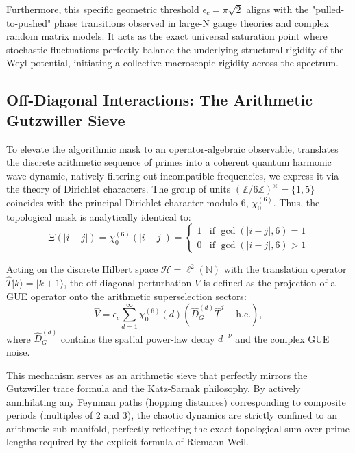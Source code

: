\documentclass[prl,aps,floatfix,superscriptaddress,10pt]{revtex4-2}
\newcommand{\N}{\mathbb{N}}
\newcommand{\Hilb}{\mathcal{H}}
\newcommand{\Zmod}{\mathbb{Z}/6\mathbb{Z}}
\begin{document}
Furthermore, this specific geometric threshold $\epsilon_c = \pi\sqrt{2}$ aligns with the "pulled-to-pushed" phase transitions observed in large-N gauge theories and complex random matrix models\cite{Gross1980, Cunden2018}. It acts as the exact universal saturation point where stochastic fluctuations perfectly balance the underlying structural rigidity of the Weyl potential, initiating a collective macroscopic rigidity across the spectrum.

\subsection{Off-Diagonal Interactions: The Arithmetic Gutzwiller Sieve}

To elevate the algorithmic mask to an operator-algebraic observable, translates the discrete arithmetic sequence of primes into a coherent quantum harmonic wave dynamic, natively filtering out incompatible frequencies, we express it via the theory of Dirichlet characters. The group of units $(\Zmod)^\times = \{1, 5\}$ coincides with the principal Dirichlet character modulo 6, $\chi_0^{(6)}$. Thus, the topological mask is analytically identical to:
\begin{equation}
\Xi(|i-j|) = \chi_0^{(6)}(|i-j|) = \begin{cases} 
1 & \text{if } \gcd(|i-j|, 6) = 1 \\ 
0 & \text{if } \gcd(|i-j|, 6) > 1 
\end{cases}
\end{equation}

Acting on the discrete Hilbert space $\Hilb = \ell^2(\N)$ with the translation operator $\hat{T}|k\rangle = |k+1\rangle$, the off-diagonal perturbation $\hat{V}$ is defined as the projection of a GUE operator onto the arithmetic superselection sectors:
\begin{equation}
\label{eq:interaction}
\hat{V} = \epsilon_c \sum_{d=1}^{\infty} \chi_0^{(6)}(d) \left( \hat{D}_G^{(d)} \hat{T}^d + \text{h.c.} \right),
\end{equation}
where $\hat{D}_G^{(d)}$ contains the spatial power-law decay $d^{-\nu}$ and the complex GUE noise. 

This mechanism serves as an arithmetic sieve that perfectly mirrors the Gutzwiller trace formula and the Katz-Sarnak philosophy. By actively annihilating any Feynman paths (hopping distances) corresponding to composite periods (multiples of 2 and 3), the chaotic dynamics are strictly confined to an arithmetic sub-manifold, perfectly reflecting the exact topological sum over prime lengths required by the explicit formula of Riemann-Weil.
\end{document}
